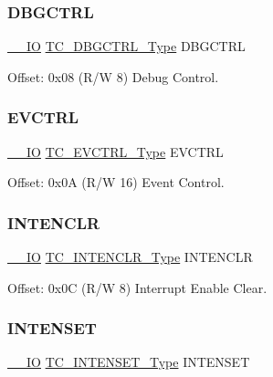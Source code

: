 \subsubsection{\texorpdfstring{DBGCTRL}{DBGCTRL}}
{\footnotesize\ttfamily \mbox{\hyperlink{core__cm0plus_8h_aec43007d9998a0a0e01faede4133d6be}{\+\_\+\+\_\+\+IO}} \mbox{\hyperlink{union_t_c___d_b_g_c_t_r_l___type}{T\+C\+\_\+\+D\+B\+G\+C\+T\+R\+L\+\_\+\+Type}} D\+B\+G\+C\+T\+RL}



Offset\+: 0x08 (R/W 8) Debug Control. 

\mbox{\label{struct_tc_count16_a5c530ba15b26365374f61a17c7cf5058}} 
\subsubsection{\texorpdfstring{EVCTRL}{EVCTRL}}
{\footnotesize\ttfamily \mbox{\hyperlink{core__cm0plus_8h_aec43007d9998a0a0e01faede4133d6be}{\+\_\+\+\_\+\+IO}} \mbox{\hyperlink{union_t_c___e_v_c_t_r_l___type}{T\+C\+\_\+\+E\+V\+C\+T\+R\+L\+\_\+\+Type}} E\+V\+C\+T\+RL}



Offset\+: 0x0A (R/W 16) Event Control. 

\mbox{\label{struct_tc_count16_a1076512cb13382301c336e0646e655f6}} 
\subsubsection{\texorpdfstring{INTENCLR}{INTENCLR}}
{\footnotesize\ttfamily \mbox{\hyperlink{core__cm0plus_8h_aec43007d9998a0a0e01faede4133d6be}{\+\_\+\+\_\+\+IO}} \mbox{\hyperlink{union_t_c___i_n_t_e_n_c_l_r___type}{T\+C\+\_\+\+I\+N\+T\+E\+N\+C\+L\+R\+\_\+\+Type}} I\+N\+T\+E\+N\+C\+LR}



Offset\+: 0x0C (R/W 8) Interrupt Enable Clear. 

\mbox{\label{struct_tc_count16_a59e384762759e5950e3d32d1f3b358d6}} 
\subsubsection{\texorpdfstring{INTENSET}{INTENSET}}
{\footnotesize\ttfamily \mbox{\hyperlink{core__cm0plus_8h_aec43007d9998a0a0e01faede4133d6be}{\+\_\+\+\_\+\+IO}} \mbox{\hyperlink{union_t_c___i_n_t_e_n_s_e_t___type}{T\+C\+\_\+\+I\+N\+T\+E\+N\+S\+E\+T\+\_\+\+Type}} I\+N\+T\+E\+N\+S\+ET}



